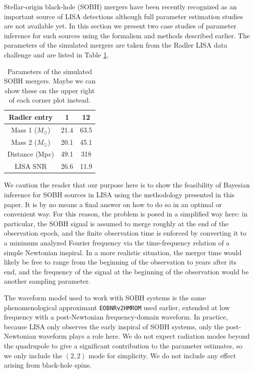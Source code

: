 \documentclass[aps,showpacs,twocolumn,prd,superscriptaddress,nofootinbib]{revtex4-1}
\newcommand{\Msol}{M_{\odot}}
\newcommand{\tdc}[1]{{\color{red} #1}}
\begin{document}
Stellar-origin black-hole (SOBH) mergers have been recently recognized as an
important source of LISA detections \cite{Sesana16} although full parameter
estimation studies are not available yet. In this section we present two case
studies of parameter inference for such sources using the formalism and methods
described earlier. The parameters of the simulated mergers are taken from the
Radler LISA data challenge and are listed in Table \ref{table:sobh_params}.
\begin{table}
	\begin{tabular}{|c||c|c|}
		\hline
		Radler entry 		& 1 	& 12   \\
		\hline
		Mass 1 ($\Msol$) 	& 21.4	& 63.5 \\
		\hline
		Mass 2 ($\Msol$) 	& 20.1	& 45.1 \\
		\hline
		Distance (Mpc) 		& 49.1	& 318  \\
		\hline
		LISA SNR 			& 26.6	& 11.9 \\
		\hline
	\end{tabular}
	\caption{Parameters of the simulated SOBH mergers. \tdc{Maybe we can show
			 these on the upper right of each corner plot instead.}}
	\label{table:sobh_params}
\end{table}

We caution the reader that our purpose here is to show the feasibility of
Bayesian inference for SOBH sources in LISA using the methodology presented in
this paper. It is by no means a final answer on how to do so in an optimal or
convenient way.  For this reason, the problem is posed in a simplified
way here: in particular, the SOBH signal is assumed to merge roughly at the end of
the observation epoch, and the finite observation time is enforced by
converting it to a minimum analyzed Fourier frequency via the time-frequency
relation of a simple Newtonian inspiral. In a more realistic situation, the
merger time would likely be free to range from the beginning of the observation
to years after its end, and the frequency of the signal at the beginning of the
observation would be another sampling parameter.

The waveform model used to work with SOBH systems is the same phenomenological
approximant \texttt{EOBNRv2HMROM} used earlier, extended at low frequency with a post-Newtonian
frequency-domain waveform. In practice, because LISA only observes the early
inspiral of SOBH systems, only the post-Newtonian waveform plays a role here.
We do not expect radiation modes beyond the quadrupole to give a significant
contribution to the parameter estimates, so we only include the $(2,2)$ mode
for simplicity. We do not include any effect arising from black-hole spins.
\end{document}
